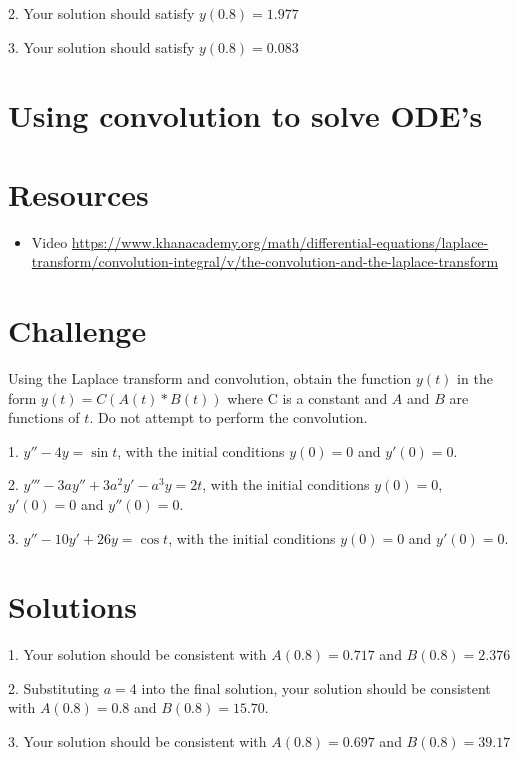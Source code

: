 2. Your solution should satisfy $y(0.8) = 1.977$

3. Your solution should satisfy $y(0.8) = 0.083$




\newpage
\section{Using convolution to solve ODE's}

\section*{Resources}
\begin{itemize}
    \item Video \url{https://www.khanacademy.org/math/differential-equations/laplace-transform/convolution-integral/v/the-convolution-and-the-laplace-transform}
\end{itemize}

\section*{Challenge}
Using the Laplace transform and convolution, obtain the function $y(t)$ in the form $y(t) = C (A(t) * B(t))$ where C is a constant and $A$ and $B$ are functions of $t$. Do not attempt to perform the convolution.

1. $\displaystyle y'' - 4 y = \sin t$, with the initial conditions $y(0) = 0$ and $y'(0) = 0$.

2. $\displaystyle y''' - 3a y'' + 3a^2 y' - a^3 y = 2 t$, with the initial conditions $y(0) = 0$, $y'(0) = 0$ and $y''(0) = 0$.

3. $\displaystyle y'' - 10y' + 26y = \cos t$, with the initial conditions $y(0) = 0$ and $y'(0) = 0$.

\section*{Solutions}

1. Your solution should be consistent with $A(0.8) = 0.717$ and $B(0.8) = 2.376$

2. Substituting $a=4$ into the final solution, your solution should be consistent with $A(0.8) = 0.8$ and $B(0.8) = 15.70$.

3. Your solution should be consistent with $A(0.8) = 0.697$ and $B(0.8) = 39.17$
